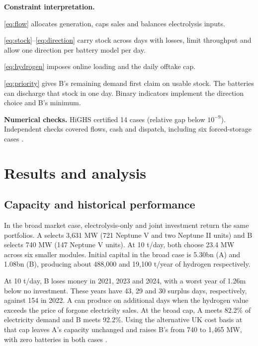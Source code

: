 {\setlength{\parskip}{0pt}
\noindent\textbf{Constraint interpretation.}\par
\noindent\eqref{eq:flow} allocates generation, caps sales and balances electrolysis inputs.\par
\noindent\eqref{eq:stock}--\eqref{eq:direction} carry stock across days with losses, limit
throughput and allow one direction per battery model per day.\par
\noindent\eqref{eq:hydrogen} imposes online loading and the daily offtake cap.\par
\noindent\eqref{eq:priority} gives B's remaining demand first claim on usable stock.
The batteries can discharge that stock in one day. Binary indicators
implement the direction choice and B's minimum.\par}

\textbf{Numerical checks.} HiGHS certified 14 cases (relative gap below
\(10^{-9}\)). Independent checks covered flows, cash and dispatch,
including six forced-storage cases \cite{v6}.

\newpage
\section{Results and analysis}\label{sec:results1}
\subsection{Capacity and historical performance}
In the broad market case, electrolysis-only and joint investment return
the same portfolios. A selects 3,631 MW (721 Neptune V and two Neptune II
units) and B selects 740 MW (147 Neptune V units). At 10 t/day, both choose
23.4 MW across six smaller modules. Initial capital in the broad case is
\gbp 5.30bn (A) and \gbp 1.08bn (B), producing about 488,000 and
19,100 t/year of hydrogen respectively.

At 10 t/day, B loses money in 2021, 2023 and 2024, with a worst
year of \gbp 1.26m below no investment. These years have 43, 29 and
30 surplus days, respectively, against 154 in 2022. A can produce on
additional days when the hydrogen value exceeds
the price of forgone electricity sales. At the broad cap, A meets 82.2\%
of electricity demand and B meets 92.2\%. Using the alternative UK cost
basis at that cap leaves A's capacity unchanged and raises B's from
740 to 1,465 MW, with zero batteries in both cases \cite{beis,v6}.

